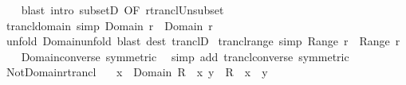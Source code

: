 \begin{isabellebody}
%
\isadelimproof
\ \ %
\endisadelimproof
%
\isatagproof
{}\isamarkupfalse%
\ {\isacharparenleft}{\kern0pt}blast\ intro{\isacharcolon}{\kern0pt}\ subsetD\ {\isacharbrackleft}{\kern0pt}OF\ rtrancl{\isacharunderscore}{\kern0pt}Un{\isacharunderscore}{\kern0pt}subset{\isacharbrackright}{\kern0pt}{\isacharparenright}{\kern0pt}%
\endisatagproof
{\isafoldproof}%
%
\isadelimproof
\isanewline
%
\endisadelimproof
\isanewline
{}\isamarkupfalse%
\ trancl{\isacharunderscore}{\kern0pt}domain\ {\isacharbrackleft}{\kern0pt}simp{\isacharbrackright}{\kern0pt}{\isacharcolon}{\kern0pt}\ {\isachardoublequoteopen}Domain\ {\isacharparenleft}{\kern0pt}r\isactrlsup {\isacharplus}{\kern0pt}{\isacharparenright}{\kern0pt}\ {\isacharequal}{\kern0pt}\ Domain\ r{\isachardoublequoteclose}\isanewline
%
\isadelimproof
\ \ %
\endisadelimproof
%
\isatagproof
{}\isamarkupfalse%
\ {\isacharparenleft}{\kern0pt}unfold\ Domain{\isacharunderscore}{\kern0pt}unfold{\isacharparenright}{\kern0pt}\ {\isacharparenleft}{\kern0pt}blast\ dest{\isacharcolon}{\kern0pt}\ tranclD{\isacharparenright}{\kern0pt}%
\endisatagproof
{\isafoldproof}%
%
\isadelimproof
\isanewline
%
\endisadelimproof
\isanewline
{}\isamarkupfalse%
\ trancl{\isacharunderscore}{\kern0pt}range\ {\isacharbrackleft}{\kern0pt}simp{\isacharbrackright}{\kern0pt}{\isacharcolon}{\kern0pt}\ {\isachardoublequoteopen}Range\ {\isacharparenleft}{\kern0pt}r\isactrlsup {\isacharplus}{\kern0pt}{\isacharparenright}{\kern0pt}\ {\isacharequal}{\kern0pt}\ Range\ r{\isachardoublequoteclose}\isanewline
%
\isadelimproof
\ \ %
\endisadelimproof
%
\isatagproof
{}\isamarkupfalse%
\ Domain{\isacharunderscore}{\kern0pt}converse\ {\isacharbrackleft}{\kern0pt}symmetric{\isacharbrackright}{\kern0pt}\ \isamarkupfalse%
\ {\isacharparenleft}{\kern0pt}simp\ add{\isacharcolon}{\kern0pt}\ trancl{\isacharunderscore}{\kern0pt}converse\ {\isacharbrackleft}{\kern0pt}symmetric{\isacharbrackright}{\kern0pt}{\isacharparenright}{\kern0pt}%
\endisatagproof
{\isafoldproof}%
%
\isadelimproof
\isanewline
%
\endisadelimproof
\isanewline
{}\isamarkupfalse%
\ Not{\isacharunderscore}{\kern0pt}Domain{\isacharunderscore}{\kern0pt}rtrancl{\isacharcolon}{\kern0pt}\isanewline
\ \ \ {\isachardoublequoteopen}x\ {\isasymnotin}\ Domain\ R{\isachardoublequoteclose}\ \ {\isachardoublequoteopen}{\isacharparenleft}{\kern0pt}x{\isacharcomma}{\kern0pt}\ y{\isacharparenright}{\kern0pt}\ {\isasymin}\ R\isactrlsup {\isacharasterisk}{\kern0pt}\ {\isasymlongleftrightarrow}\ x\ {\isacharequal}{\kern0pt}\ y{\isachardoublequoteclose}\isanewline

\end{isabellebody}
